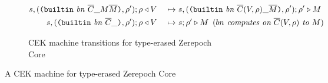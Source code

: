 \documentclass[../zerepoch-core-specification.tex]{subfiles}
\begin{document}
\begin{figure}[H]
\begin{subfigure}[c]{\linewidth}
\begin{minipage}{\linewidth}
\begin{alignat*}{2}
  s,(\texttt{(} \texttt{builtin} ~ \mathit{bn} ~ \overline{C} \_ M \overline{M} \texttt{)}, \rho^{\prime});\rho & \triangleleft V
                                                 &~\mapsto~& s,(\texttt{(} \texttt{builtin} ~ \mathit{bn} ~ \overline{C}(V,\rho) \_ \overline{M} \texttt{)}, \rho^{\prime});\rho^{\prime}
                                                 \triangleright M\\
  s,(\texttt{(} \texttt{builtin} ~ \mathit{bn} ~ \overline{C} \_  \texttt{)}, \rho^{\prime});\rho & \triangleleft V
                                                 &~\mapsto~&  s;\rho^{\prime} \triangleright M
                                                 \enspace (\textit{$bn$ computes on $\overline{C}(V,\rho)$ to $M$})\\
    \end{alignat*}
\end{minipage}
    \caption{CEK machine transitions for type-erased Zerepoch Core}
    \label{fig:untyped-cek-transitions}
\end{subfigure}
\caption{A CEK machine for type-erased Zerepoch Core}
\label{fig:untyped-cek-machine}
\end{figure}

\end{document}
